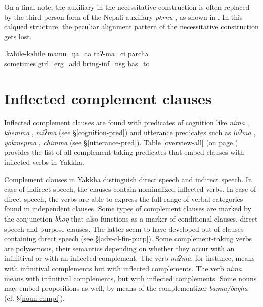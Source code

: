 On a final note, the auxiliary in the necessitative construction  is often replaced by the third person form of the Nepali auxiliary \emph{pʌrnu} , as shown in \Next. In this calqued structure, the peculiar alignment pattern of the necessitative construction gets lost.

\exg.kʌhile-kʌhile mamu=ŋa=ca  taʔ-ma=ci       pʌrchʌ\\ 
sometimes girl{\sc =erg=add} bring-{\sc inf=nsg} {\sc has\_to}\\
 

 		
\section{Inflected complement clauses} \label{fin-comp}

Inflected complement clauses are found with predicates of  cognition like \emph{nima} , \emph{khemma} , \emph{miʔma}   (see §\ref{cognition-pred}) and utterance predicates such as  \emph{luʔma} , \emph{yokmepma} , \emph{chimma}  (see §\ref{utterance-pred}). Table \ref{overview-all} (on page \pageref{overview-all}) provides the list of all complement-taking predicates that embed clauses with inflected verbs in Yakkha. 

Complement clauses in Yakkha distinguish direct speech and indirect speech. In case of indirect speech, the  clauses contain nominalized inflected verbs.  In case of direct speech, the verbs are able to express the full range of verbal categories found in independent clauses. Some types of complement clauses are marked by the conjunction \emph{bhoŋ} that also functions as a marker of conditional clauses,  direct speech and purpose clauses. The latter seem to have developed out of clauses containing direct  speech (see §\ref{adv-cl-fin-purp}). Some complement-taking verbs are polysemous, their semantics depending on whether they occur with an infinitival or with an inflected complement. The verb \emph{miʔma}, for instance, means  with infinitival complements but  with inflected complements. The verb \emph{nima} means  with infinitival complements, but  with inflected complements. Some nouns may embed propositions  as well, by means of the complementizer \emph{baŋna/baŋha} (cf. §\ref{noun-compl}). 


